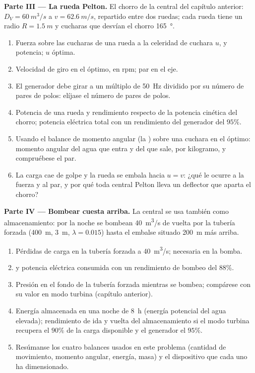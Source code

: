 \begin{problem}
\medskip
\noindent\textbf{Parte III --- La rueda Pelton.}
El chorro de la central del capítulo anterior: $D_V = \qty{60}{m^3/s}$ a $v =
\qty{62.6}{m/s}$, repartido entre dos ruedas; cada rueda tiene un radio $R =
\qty{1.5}{m}$ y cucharas que desvían el chorro \qty{165}{\degree}.
\begin{enumerate}[resume]
  \item Fuerza sobre las cucharas de una rueda a la celeridad de cuchara
        $u$, y potencia; $u$ óptima.
  \item Velocidad de giro en el óptimo, en rpm; par en el eje.
  \item El generador debe girar a un múltiplo de \qty{50}{Hz} dividido por
        su número de pares de polos: elíjase el número de pares de polos.
  \item Potencia de una rueda y rendimiento respecto de la potencia
        cinética del chorro; potencia eléctrica total con un rendimiento
        del generador del $95\%$.
  \item Usando el balance de momento angular (la ) sobre una cuchara en el óptimo: momento angular del
        agua que entra y del que sale, por kilogramo, y compruébese el
        par.
  \item La carga cae de golpe y la rueda se embala hacia $u =
        v$: ¿qué le ocurre a la fuerza y al par, y por qué toda central
        Pelton lleva un deflector que aparta el chorro?
\end{enumerate}

\medskip
\noindent\textbf{Parte IV --- Bombear cuesta arriba.}
La central se usa también como almacenamiento: por la noche se bombean
\qty{40}{m^3/s} de vuelta por la tubería forzada (\qty{400}{m}, \qty{3}{m}, $\lambda = 0.015$) hasta el
embalse situado \qty{200}{m} más arriba.
\begin{enumerate}[resume]
  \item Pérdidas de carga en la tubería forzada a \qty{40}{m^3/s};  necesaria en la bomba.
  \item {} y potencia eléctrica consumida con un
        rendimiento de bombeo del $88\%$.
  \item Presión en el fondo de la tubería forzada mientras se bombea;
        compárese con su valor en modo turbina (capítulo anterior).
  \item Energía almacenada en una noche de \qty{8}{h} (energía potencial
        del agua elevada); rendimiento de ida y vuelta del almacenamiento
        si el modo turbina recupera el $90\%$ de la carga disponible y el
        generador el $95\%$.
  \item Resúmanse los cuatro balances usados en este problema (cantidad de
        movimiento, momento angular, energía, masa) y el dispositivo que
        cada uno ha dimensionado.
\end{enumerate}
\end{problem}
